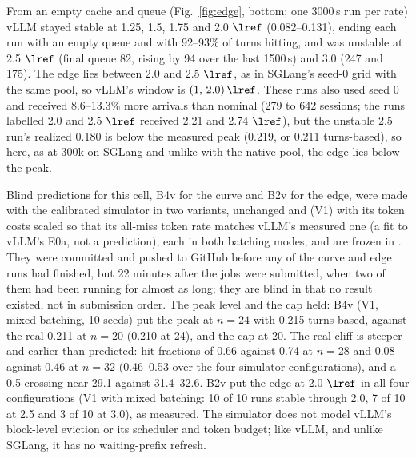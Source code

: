From an empty cache and queue (Fig.~\ref{fig:edge}, bottom; one 3000\,s run per rate) vLLM stayed stable at 1.25, 1.5, 1.75 and 2.0 $\lref$ (0.082--0.131\sps), ending each run with an empty queue and with 92--93\% of turns hitting, and was unstable at 2.5 $\lref$ (final queue 82, rising by 94 over the last 1500\,s) and 3.0 (247 and 175). The edge lies between 2.0 and 2.5 $\lref$, as in SGLang's seed-0 grid with the same pool, so vLLM's window is $(1,\,2.0)\,\lref$. These runs also used seed 0 and received 8.6--13.3\% more arrivals than nominal (279 to 642 sessions; the runs labelled 2.0 and 2.5 $\lref$ received 2.21 and 2.74 $\lref$), but the unstable 2.5 run's realized 0.180\sps{} is below the measured peak (0.219, or 0.211 turns-based), so here, as at 300k on SGLang and unlike with the native pool, the edge lies below the peak.

Blind predictions for this cell, B4v for the curve and B2v for the edge, were made with the calibrated simulator in two variants, unchanged and (V1) with its token costs scaled so that its all-miss token rate matches vLLM's measured one (a fit to vLLM's E0a, not a prediction), each in both batching modes, and are frozen in . They were committed and pushed to GitHub before any of the curve and edge runs had finished, but 22 minutes after the jobs were submitted, when two of them had been running for almost as long; they are blind in that no result existed, not in submission order. The peak level and the cap held: B4v (V1, mixed batching, 10 seeds) put the peak at $n=24$ with 0.215\sps{} turns-based, against the real 0.211 at $n=20$ (0.210 at 24), and the cap at 20. The real cliff is steeper and earlier than predicted: hit fractions of 0.66 against 0.74 at $n=28$ and 0.08 against 0.46 at $n=32$ (0.46--0.53 over the four simulator configurations), and a 0.5 crossing near 29.1 against 31.4--32.6. B2v put the edge at 2.0 $\lref$ in all four configurations (V1 with mixed batching: 10 of 10 runs stable through 2.0, 7 of 10 at 2.5 and 3 of 10 at 3.0), as measured. The simulator does not model vLLM's block-level eviction or its scheduler and token budget; like vLLM, and unlike SGLang, it has no waiting-prefix refresh.

